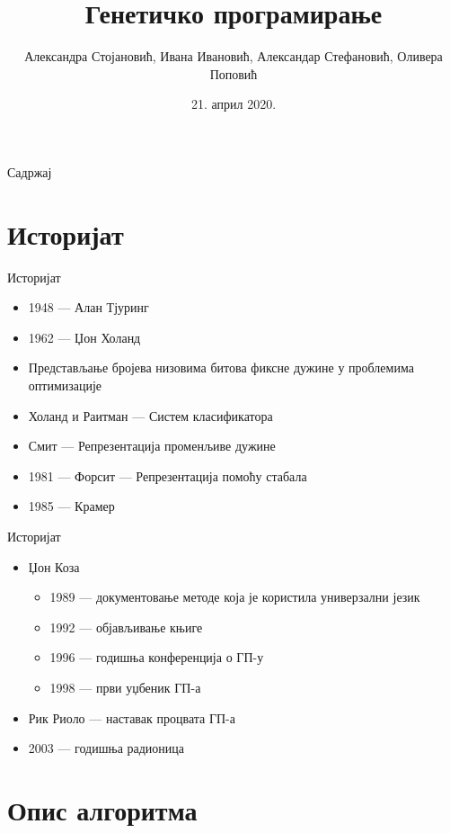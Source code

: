 \documentclass{beamer}
\title[Генетичко програмирање]{Генетичко програмирање}
\author[Стојановић, Ивановић, Стефановић, Поповић]{Александра Стојановић, Ивана Ивановић, Александар Стефановић, Оливера Поповић}
\institute[МАТФ]{Математички факултет\\Универзитет у Београду}
\date{21. април 2020.}
\begin{document}
\begin{frame}
  \titlepage
\end{frame}

\begin{frame}{Садржај}
  \tableofcontents
\end{frame}

\section{Историјат}

\begin{frame}{Историјат}
    \begin{itemize}
        \item 1948 — Алан Тјуринг
        \item 1962 — Џон Холанд
        \item Представљање бројева низовима битова фиксне дужине у проблемима оптимизације
        \item Холанд и Раитман — Систем класификатора
        \item Смит — Репрезентација променљиве дужине
        \item 1981 — Форсит — Репрезентација помоћу стабала
        \item 1985 — Крамер
    \end{itemize}
\end{frame}

\begin{frame}{Историјат}
    \begin{itemize}
        \item Џон Коза
        \begin{itemize}
            \item 1989 — документовање методе која је користила универзални језик
            \item 1992 — објављивање књиге
            \item 1996 — годишња конференција о ГП-у
            \item 1998 — први уџбеник ГП-а
        \end{itemize}
        \item Рик Риоло — наставак процвата ГП-а
        \item 2003 — годишња радионица
    \end{itemize}
\end{frame}

\section{Опис алгоритма}
\end{document}
